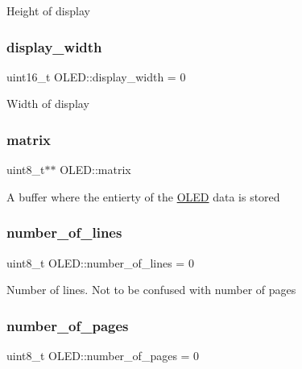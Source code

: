 Height of display \hypertarget{class_o_l_e_d_ae88ab3d6d63a7ead982a3b7cc673eefe}{}\label{class_o_l_e_d_ae88ab3d6d63a7ead982a3b7cc673eefe} 
\subsubsection{\texorpdfstring{display\+\_\+width}{display\_width}}
{\footnotesize\ttfamily uint16\+\_\+t O\+L\+E\+D\+::display\+\_\+width = 0\hspace{0.3cm}{\ttfamily [private]}}

Width of display \hypertarget{class_o_l_e_d_a9d32e21189940afba24deab0a2bc0126}{}\label{class_o_l_e_d_a9d32e21189940afba24deab0a2bc0126} 
\subsubsection{\texorpdfstring{matrix}{matrix}}
{\footnotesize\ttfamily uint8\+\_\+t$\ast$$\ast$ O\+L\+E\+D\+::matrix\hspace{0.3cm}{\ttfamily [private]}}

A buffer where the entierty of the \hyperlink{class_o_l_e_d}{O\+L\+ED} data is stored \hypertarget{class_o_l_e_d_a9ea1c55112deede1a61142af276a6bc9}{}\label{class_o_l_e_d_a9ea1c55112deede1a61142af276a6bc9} 
\subsubsection{\texorpdfstring{number\+\_\+of\+\_\+lines}{number\_of\_lines}}
{\footnotesize\ttfamily uint8\+\_\+t O\+L\+E\+D\+::number\+\_\+of\+\_\+lines = 0\hspace{0.3cm}{\ttfamily [private]}}

Number of lines. Not to be confused with number of pages \hypertarget{class_o_l_e_d_aaac99b0eb4e9dfe92b8571488dc89288}{}\label{class_o_l_e_d_aaac99b0eb4e9dfe92b8571488dc89288} 
\subsubsection{\texorpdfstring{number\+\_\+of\+\_\+pages}{number\_of\_pages}}
{\footnotesize\ttfamily uint8\+\_\+t O\+L\+E\+D\+::number\+\_\+of\+\_\+pages = 0\hspace{0.3cm}{\ttfamily [private]}}

